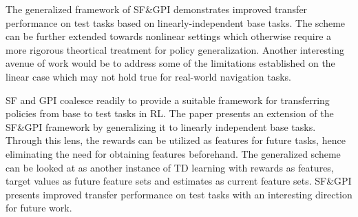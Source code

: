 \documentclass[11pt,letterpaper]{article}
\begin{document}
The generalized framework of SF\&GPI demonstrates improved transfer performance on test tasks based on linearly-independent base tasks. The scheme can be further extended towards nonlinear settings which otherwise require a more rigorous theortical treatment for policy generalization. Another interesting avenue of work would be to address some of the limitations established on the linear case which may not hold true for real-world navigation tasks. 

SF and GPI coalesce readily to provide a suitable framework for transferring policies from base to test tasks in RL. The paper presents an extension of the SF\&GPI framework by generalizing it to linearly independent base tasks. Through this lens, the rewards can be utilized as features for future tasks, hence eliminating the need for obtaining features beforehand. The generalized scheme can be looked at as another instance of TD learning with rewards as features, target values as future feature sets and estimates as current feature sets. SF\&GPI presents improved transfer performance on test tasks with an interesting direction for future work. 
\end{document}
